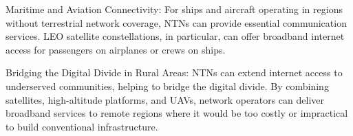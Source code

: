 Maritime and Aviation Connectivity: For ships and aircraft operating in regions without terrestrial network coverage, NTNs can provide essential communication services. LEO satellite constellations, in particular, can offer broadband internet access for passengers on airplanes or crews on ships.

Bridging the Digital Divide in Rural Areas: NTNs can extend internet access to underserved communities, helping to bridge the digital divide. By combining satellites, high-altitude platforms, and UAVs, network operators can deliver broadband services to remote regions where it would be too costly or impractical to build conventional infrastructure.

